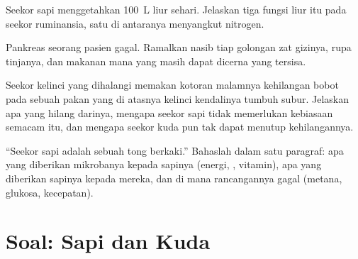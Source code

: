 \begin{exercise}[$\star\star$]\label{exo:b1:digestion-absorption:9}
Seekor sapi menggetahkan \qty{100}{L} liur sehari. Jelaskan tiga fungsi
liur itu pada seekor ruminansia, satu di antaranya menyangkut
nitrogen.
\end{exercise}

\begin{exercise}[$\star\star\star$]\label{exo:b1:digestion-absorption:10}
Pankreas seorang pasien gagal. Ramalkan nasib tiap golongan zat
gizinya, rupa tinjanya, dan makanan mana yang masih dapat dicerna
 yang tersisa.
\end{exercise}

\begin{exercise}[$\star\star\star$]\label{exo:b1:digestion-absorption:11}
Seekor kelinci yang dihalangi memakan kotoran malamnya kehilangan
bobot pada sebuah pakan yang di atasnya kelinci kendalinya tumbuh
subur. Jelaskan apa yang hilang darinya, mengapa seekor sapi tidak
memerlukan kebiasaan semacam itu, dan mengapa seekor kuda pun tak
dapat menutup kehilangannya.
\end{exercise}

\begin{exercise}[$\star\star\star$]\label{exo:b1:digestion-absorption:12}
``Seekor sapi adalah sebuah tong  berkaki.'' Bahaslah dalam
satu paragraf: apa yang diberikan mikrobanya kepada sapinya (energi,
, vitamin), apa yang diberikan sapinya kepada mereka, dan di
mana rancangannya gagal (metana, glukosa, kecepatan).
\end{exercise}

\section{Soal: Sapi dan Kuda}

